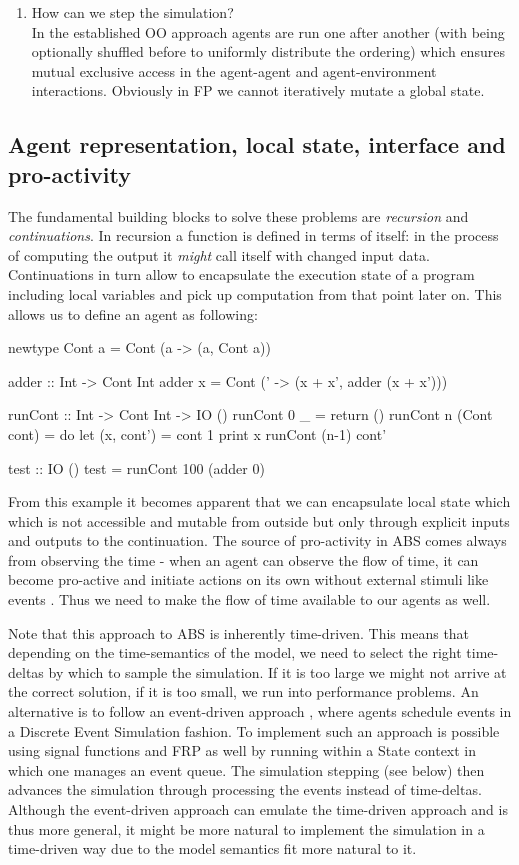 \begin{enumerate}
	\item How can we step the simulation? \\
	In the established OO approach agents are run one after another (with being optionally shuffled before to uniformly distribute the ordering) which ensures mutual exclusive access in the agent-agent and agent-environment interactions. Obviously in FP we cannot iteratively mutate a global state.
\end{enumerate}

\subsection{Agent representation, local state, interface and pro-activity}
The fundamental building blocks to solve these problems are \textit{recursion} and \textit{continuations}. In recursion a function is defined in terms of itself: in the process of computing the output it \textit{might} call itself with changed input data. Continuations in turn allow to encapsulate the execution state of a program including local variables and pick up computation from that point later on. This allows us to define an agent as following:

\begin{HaskellCode}
newtype Cont a = Cont (a -> (a, Cont a))

adder :: Int -> Cont Int
adder x = Cont (\x' -> (x + x', adder (x + x')))

runCont :: Int -> Cont Int -> IO ()
runCont 0 _ = return ()
runCont n (Cont cont) = do
  let (x, cont') = cont 1
  print x
  runCont (n-1) cont'

test :: IO ()
test = runCont 100 (adder 0)
\end{HaskellCode}

From this example it becomes apparent that we can encapsulate local state which which is not accessible and mutable from outside but only through explicit inputs and outputs to the continuation. The source of pro-activity in ABS comes always from observing the time - when an agent can observe the flow of time, it can become pro-active and initiate actions on its own without external stimuli like events \cite{thaler_art_2017}. Thus we need to make the flow of time available to our agents as well. 

Note that this approach to ABS is inherently time-driven. This means that depending on the time-semantics of the model, we need to select the right time-deltas by which to sample the simulation. If it is too large we might not arrive at the correct solution, if it is too small, we run into performance problems. An alternative is to follow an event-driven approach \cite{meyer_event-driven_2014}, where agents schedule events in a Discrete Event Simulation fashion. To implement such an approach is possible using signal functions and FRP as well by running within a State context in which one manages an event queue. The simulation stepping (see below) then advances the simulation through processing the events instead of time-deltas. Although the event-driven approach can emulate the time-driven approach and is thus more general, it might be more natural to implement the simulation in a time-driven way due to the model semantics fit more natural to it.

